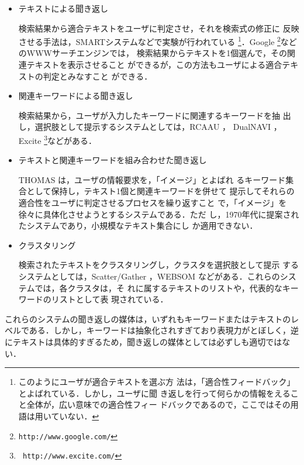 \begin{itemize}
 \item テキストによる聞き返し

       検索結果から適合テキストをユーザに判定させ，それを検索式の修正に
       反映させる手法は，SMARTシステムなどで実験が行われている
       \cite{Rocchio71} \footnote{このようにユーザが適合テキストを選ぶ方
       法は，「適合性フィードバック」とよばれている．しかし，ユーザに聞
       き返しを行って何らかの情報をえること全体が，広い意味での適合性フィー
       ドバックであるので，ここではその用語は用いていない．}．Google
       \footnote{\tt http://www.google.com/}などのWWWサーチエンジンでは，
       検索結果からテキストを1個選んで，その関連テキストを表示させること
       ができるが，この方法もユーザによる適合テキストの判定とみなすこと
       ができる．

 \item 関連キーワードによる聞き返し

       検索結果から，ユーザが入力したキーワードに関連するキーワードを抽
       出し，選択肢として提示するシステムとしては，RCAAU \cite{RCAAU}，
       DualNAVI \cite{DualNAVI}，Excite \footnote{\tt
       http://www.excite.com/}などがある．

 \item テキストと関連キーワードを組み合わせた聞き返し

       THOMAS \cite{Oddy77}は，ユーザの情報要求を，「イメージ」とよばれ
       るキーワード集合として保持し，テキスト1個と関連キーワードを併せて
       提示してそれらの適合性をユーザに判定させるプロセスを繰り返すこと
       で，「イメージ」を徐々に具体化させようとするシステムである．ただ
       し，1970年代に提案されたシステムであり，小規模なテキスト集合にし
       か適用できない．

 \item クラスタリング

       検索されたテキストをクラスタリングし，クラスタを選択肢として提示
       するシステムとしては，Scatter/Gather \cite{Hearst96}，WEBSOM
       \cite{Lagus00}などがある．これらのシステムでは，各クラスタは，そ
       れに属するテキストのリストや，代表的なキーワードのリストとして表
       現されている．

\end{itemize}


これらのシステムの聞き返しの媒体は，いずれもキーワードまたはテキストのレ
ベルである．しかし，キーワードは抽象化されすぎており表現力がとぼしく，逆
にテキストは具体的すぎるため，聞き返しの媒体としては必ずしも適切ではない．

